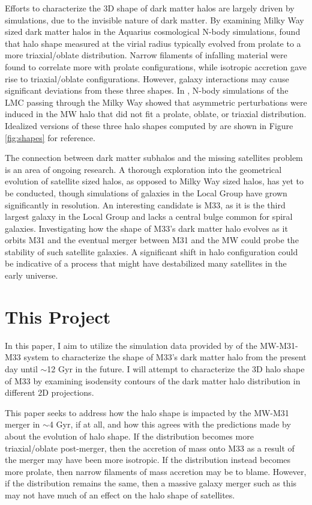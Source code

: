 \documentclass[twocolumn, linenumbers,trackchanges]{aastex7}
\begin{document}
Efforts to characterize the 3D shape of dark matter halos are largely driven by simulations, due to the invisible nature of dark matter. By examining Milky Way sized dark matter halos in the Aquarius cosmological N-body simulations, \cite{Vera-Ciro_2011} found that halo shape measured at the virial radius typically evolved from prolate to a more triaxial/oblate distribution. Narrow filaments of infalling material were found to correlate more with prolate configurations, while isotropic accretion gave rise to triaxial/oblate configurations. However, galaxy interactions may cause significant deviations from these three shapes. In \cite{Garavito-Camargo_2021}, N-body simulations of the LMC passing through the Milky Way showed that asymmetric perturbations were induced in the MW halo that did not fit a prolate, oblate, or triaxial distribution. Idealized versions of these three halo shapes computed by \cite{Garavito-Camargo_2021} are shown in Figure \ref{fig:shapes} for reference. 

The connection between dark matter subhalos and the missing satellites problem is an area of ongoing research. A thorough exploration into the geometrical evolution of satellite sized halos, as opposed to Milky Way sized halos, has yet to be conducted, though simulations of galaxies in the Local Group have grown significantly in resolution. An interesting candidate is M33, as it is the third largest galaxy in the Local Group and lacks a central bulge common for spiral galaxies. Investigating how the shape of M33's dark matter halo evolves as it orbits M31 and the eventual merger between M31 and the MW could probe the stability of such satellite galaxies. A significant shift in halo configuration could be indicative of a process that might have destabilized many satellites in the early universe.  

\section{This Project}
In this paper, I aim to utilize the simulation data provided by \cite{van_der_Marel_2012} of the MW-M31-M33 system to characterize the shape of M33's dark matter halo from the present day until $\sim$12 Gyr in the future. I will attempt to characterize the 3D halo shape of M33 by examining isodensity contours of the dark matter halo distribution in different 2D projections. 

This paper seeks to address how the halo shape is impacted by the MW-M31 merger in $\sim$4 Gyr, if at all, and how this agrees with the predictions made by \cite{Vera-Ciro_2011} about the evolution of halo shape. If the distribution becomes more triaxial/oblate post-merger, then the accretion of mass onto M33 as a result of the merger may have been more isotropic. If the distribution instead becomes more prolate, then narrow filaments of mass accretion  may be to blame. However, if the distribution remains the same, then a massive galaxy merger such as this may not have much of an effect on the halo shape of satellites. 
\end{document}
